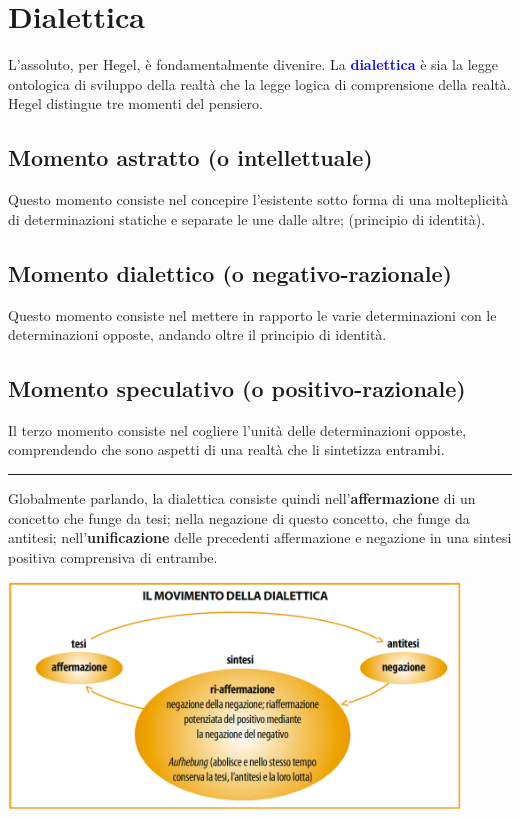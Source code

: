 \documentclass[a4paper, twoside, titlepage]{book}
\renewcommand{\emph}[1]{\textcolor{blue}{#1}}
\begin{document}
\chapter{Dialettica}

L'assoluto, per Hegel, è fondamentalmente divenire. La \emph{\textbf{dialettica}} è sia la legge ontologica di sviluppo della realtà che la legge logica di comprensione della realtà. Hegel distingue tre momenti del pensiero.

\section{Momento astratto (o intellettuale)}

Questo momento consiste nel concepire l'esistente sotto forma di una molteplicità di determinazioni statiche e separate le une dalle altre; (principio di identità).
 
\section{Momento dialettico (o negativo-razionale)}

Questo momento consiste nel mettere in rapporto le varie determinazioni con le determinazioni opposte, andando oltre il principio di identità.

\section{Momento speculativo (o positivo-razionale)}

Il terzo momento consiste nel cogliere l'unità delle determinazioni opposte, comprendendo che sono aspetti di una realtà che li sintetizza entrambi.

\medskip\hrule\medskip

Globalmente parlando, la dialettica consiste quindi nell'\textbf{affermazione} di un concetto che funge da tesi; nella negazione di questo concetto, che funge da antitesi; nell'\textbf{unificazione} delle precedenti affermazione e negazione in una sintesi positiva comprensiva di entrambe.

\begin{center}
\includegraphics[width=12cm]{5}
\end{center}
\end{document}
